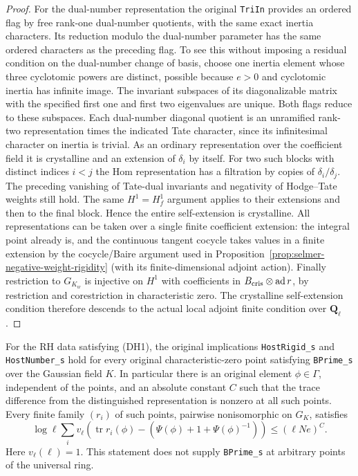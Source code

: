 \begin{proof}
For the dual-number representation the original \texttt{TriIn}
provides an ordered flag by free rank-one dual-number quotients,
with the same exact inertia characters.  Its reduction modulo
the dual-number parameter has the same ordered characters
as the preceding flag.  To see this without imposing a
residual condition on the dual-number change of basis, choose
one inertia element whose three cyclotomic powers are distinct,
possible because $e>0$ and cyclotomic inertia has infinite image.
The invariant subspaces of its diagonalizable matrix with the
specified first one and first two eigenvalues are unique.
Both flags reduce to these subspaces.  Each dual-number
diagonal quotient is an unramified rank-two representation
times the indicated Tate character, since its infinitesimal
character on inertia is trivial.  As an ordinary representation
over the coefficient field it is crystalline and an extension
of $\delta_i$ by itself.  For two such blocks with distinct
indices $i<j$ the Hom representation has a filtration by copies
of $\delta_i/\delta_j$.  The preceding vanishing of Tate-dual
invariants and negativity of Hodge--Tate weights still hold.
The same $H^1=H_f^1$ argument applies to their extensions and
then to the final block.  Hence the entire self-extension is
crystalline.  All representations can be taken over a single
finite coefficient extension: the integral point already is,
and the continuous tangent cocycle takes values in a finite
extension by the cocycle/Baire argument used in
Proposition~\ref{prop:selmer-negative-weight-rigidity} (with
its finite-dimensional adjoint action).
Finally restriction to $G_{K_w}$ is injective on $H^1$ with
coefficients in $B_{\rm cris}\otimes\operatorname{ad}r$,
by restriction and corestriction in characteristic zero.
The crystalline self-extension condition therefore descends
to the actual local adjoint finite condition over $\mathbf Q_\ell$.
\end{proof}

\begin{theorem}
\label{thm:rh-dyadic-host-traces}
For the RH data satisfying (DH1), the original implications
\texttt{HostRigid\_s} and \texttt{HostNumber\_s} hold for every
original characteristic-zero point satisfying
\texttt{BPrime\_s} over the Gaussian field $K$.
In particular there is an original element $\phi\in\Gamma$,
independent of the points, and an absolute constant $C$ such that
the trace difference from the distinguished representation is
nonzero at all such points.  Every finite family $(r_i)$ of
such points, pairwise nonisomorphic on $G_K$, satisfies
\[
  \log\ell\sum_i v_\ell\left(
       \operatorname{tr}r_i(\phi)-(\Psi(\phi)+1+\Psi(\phi)^{-1})
                              \right)\le(\ell Ne)^C.           \tag{DH6}
\]
Here $v_\ell(\ell)=1$.  This statement does not supply
\texttt{BPrime\_s} at arbitrary points of the universal ring.
\end{theorem}

